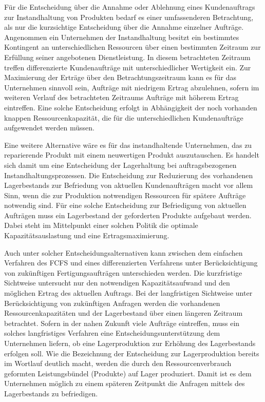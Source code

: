 Für die Entscheidung über die Annahme oder Ablehnung eines Kundenauftrags zur Instandhaltung von Produkten bedarf es einer umfassenderen Betrachtung, als nur die kurzsichtige Entscheidung über die Annahme einzelner Aufträge. Angenommen ein Unternehmen der Instandhaltung besitzt ein bestimmtes Kontingent an unterschiedlichen Ressourcen über einen bestimmten Zeitraum zur Erfüllung seiner angebotenen Dienstleistung. In diesem betrachteten Zeitraum treffen differenzierte Kundenaufträge mit unterschiedlicher Wertigkeit ein. Zur Maximierung der Erträge über den Betrachtungszeitraum kann es für das Unternehmen sinnvoll sein, Aufträge mit niedrigem Ertrag abzulehnen, sofern im weiteren Verlauf des betrachteten Zeitraums Aufträge mit höherem Ertrag eintreffen. Eine solche Entscheidung erfolgt in Abhängigkeit der noch vorhanden knappen Ressourcenkapazität, die für die unterschiedlichen Kundenaufträge aufgewendet werden müssen.

Eine weitere Alternative wäre es für das instandhaltende Unternehmen, das zu reparierende Produkt mit einem neuwertigen Produkt auszutauschen. Es handelt sich damit um eine Entscheidung der Lagerhaltung bei auftragsbezogenen Instandhaltungsprozessen. Die Entscheidung zur Reduzierung des vorhandenen Lagerbestands zur Befriedung von aktuellen Kundenaufträgen macht vor allem Sinn, wenn die zur Produktion notwendigen Ressourcen für spätere Aufträge notwendig sind. Für eine solche Entscheidung zur Befriedigung von aktuellen Aufträgen muss ein Lagerbestand der geforderten Produkte aufgebaut werden. Dabei steht im Mittelpunkt einer solchen Politik die optimale Kapazitätsauslastung und eine Ertragsmaximierung.

Auch unter solcher Entscheidungsalternativen kann zwischen dem einfachen Verfahren des FCFS und eines differenzierten Verfahrens unter Berücksichtigung von zukünftigen Fertigungsaufträgen unterschieden werden. Die kurzfristige Sichtweise untersucht nur den notwendigen Kapazitätsaufwand und den möglichen Ertrag des aktuellen Auftrags. Bei der langfristigen Sichtweise unter Berücksichtigung von zukünftigen Anfragen werden die vorhandenen Ressourcenkapazitäten und der Lagerbestand über einen längeren Zeitraum betrachtet. Sofern in der nahen Zukunft viele Aufträge eintreffen, muss ein solches langfristiges Verfahren eine Entscheidungsunterstützung dem Unternehmen liefern, ob eine Lagerproduktion zur Erhöhung des Lagerbestands erfolgen soll. Wie die Bezeichnung der Entscheidung zur Lagerproduktion bereits im Wortlauf deutlich macht, werden die durch den Ressourcenverbrauch geformten Leistungsbündel (Produkte) auf Lager produziert. Damit ist es dem Unternehmen möglich zu einem späteren Zeitpunkt die Anfragen mittels des Lagerbestands zu befriedigen.

